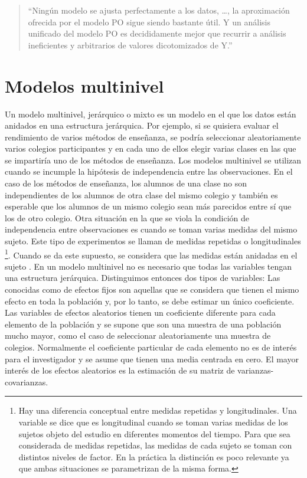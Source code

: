 \documentclass[
  12pt,
  a4paper,
  extrafontsizes,
  onecolumn,
  openright]{memoir}
\newlength{\rf}
\begin{document}
\begin{quote}
\enquote{Ningún modelo se ajusta perfectamente a los datos, \ldots, la
aproximación ofrecida por el modelo PO sigue siendo bastante útil. Y un
análisis unificado del modelo PO es decididamente mejor que recurrir a
análisis ineficientes y arbitrarios de valores dicotomizados de Y.}
\end{quote}

\hypertarget{modelos-multinivel}{%
\section{Modelos multinivel}\label{modelos-multinivel}}

Un modelo multinivel, jerárquico o mixto es un modelo en el que los
datos están anidados en una estructura jerárquica. Por ejemplo, si se
quisiera evaluar el rendimiento de varios métodos de enseñanza, se
podría seleccionar aleatoriamente varios colegios participantes y en
cada uno de ellos elegir varias clases en las que se impartiría uno de
los métodos de enseñanza. Los modelos multinivel se utilizan cuando se
incumple la hipótesis de independencia entre las observaciones. En el
caso de los métodos de enseñanza, los alumnos de una clase no son
independientes de los alumnos de otra clase del mismo colegio y también
es esperable que los alumnos de un mismo colegio sean más parecidos
entre sí que los de otro colegio. Otra situación en la que se viola la
condición de independencia entre observaciones es cuando se toman varias
medidas del mismo sujeto. Este tipo de experimentos se llaman de medidas
repetidas o longitudinales \footnote{Hay una diferencia conceptual entre
  medidas repetidas y longitudinales. Una variable se dice que es
  longitudinal cuando se toman varias medidas de los sujetos objeto del
  estudio en diferentes momentos del tiempo. Para que sea considerada de
  medidas repetidas, las medidas de cada sujeto se toman con distintos
  niveles de factor. En la práctica la distinción es poco relevante ya
  que ambas situaciones se parametrizan de la misma forma.}. Cuando se
da este supuesto, se considera que las medidas están anidadas en el
sujeto \autocite[ver][]{Liu2202}. En un modelo multinivel no es
necesario que todas las variables tengan una estructura jerárquica.
Distinguimos entonces dos tipos de variables: Las conocidas como de
efectos fijos son aquellas que se considera que tienen el mismo efecto
en toda la población y, por lo tanto, se debe estimar un único
coeficiente. Las variables de efectos aleatorios tienen un coeficiente
diferente para cada elemento de la población y se supone que son una
muestra de una población mucho mayor, como el caso de seleccionar
aleatoriamente una muestra de colegios. Normalmente el coeficiente
particular de cada elemento no es de interés para el investigador y se
asume que tienen una media centrada en cero. El mayor interés de los
efectos aleatorios es la estimación de su matriz de
varianzas-covarianzas.
\end{document}
